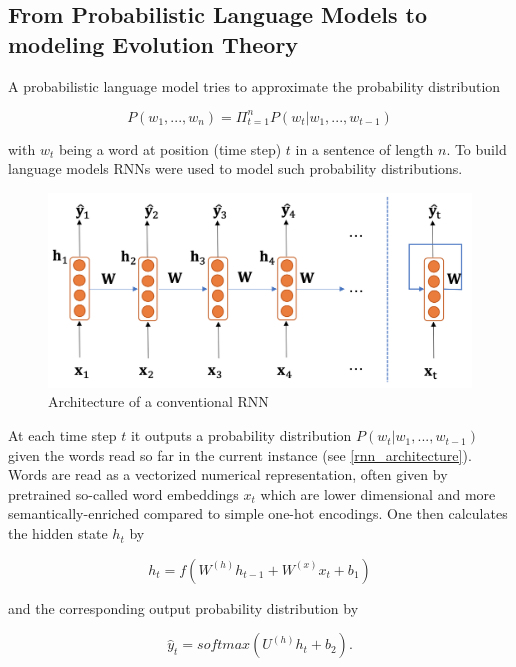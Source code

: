 \subsection{From Probabilistic Language Models to modeling Evolution Theory} \label{fundamentalsA}

A probabilistic language model tries to approximate the probability distribution 

\begin{equation}
	P(w_1, ..., w_n) = \Pi_{t=1}^{n} P(w_t | w_1, ..., w_{t-1})
\end{equation}

with $w_t$ being a word at position (time step) $t$ in a sentence of length $n$. To build language models \acp{RNN} were used to model such probability distributions. 

\begin{figure}[ht]
	\centering
	\includegraphics[width=0.8\linewidth]{figures/rnn_architecture.png}
	\caption{Architecture of a conventional \ac{RNN} \cite{Gertz2020}}
	\label{rnn_architecture}
\end{figure}

At each time step $t$ it outputs a probability distribution $P(w_t | w_1, ..., w_{t-1})$ given the words read so far in the current instance (see \autoref{rnn_architecture}). Words are read as a vectorized numerical representation, often given by pretrained so-called word embeddings $x_t$ which are lower dimensional and more semantically-enriched compared to simple one-hot encodings. One then calculates the hidden state $h_t$ by

\begin{equation}
	h_t = f(W^{(h)} h_{t-1} + W^{(x)} x_t + b_1)
\end{equation}

and the corresponding output probability distribution by 

\begin{equation}
	\hat{y}_t = softmax(U^{(h)} h_t + b_2).
\end{equation}

